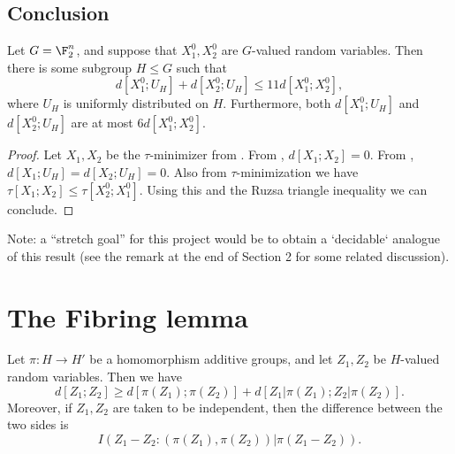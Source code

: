 \section{Conclusion}

\begin{theorem}\label{entropy-pfr}
  \leanok
  Let $G = \F_2^n$, and suppose that $X^0_1, X^0_2$ are $G$-valued random variables.
  Then there is some subgroup $H \leq G$ such that
  \[
    d[X^0_1;U_H] + d[X^0_2;U_H] \le 11 d[X^0_1;X^0_2],
  \]
  where $U_H$ is uniformly distributed on $H$.
  Furthermore, both $d[X^0_1;U_H]$ and $d[X^0_2;U_H]$ are at most $6 d[X^0_1;X^0_2]$.
\end{theorem}

\begin{proof}  \leanok  Let $X_1, X_2$ be the $\tau$-minimizer from .  From , $d[X_1;X_2]=0$.  From , $d[X_1;U_H] = d[X_2; U_H] = 0$.  Also from $\tau$-minimization we have $\tau[X_1;X_2] \leq \tau[X^0_2;X^0_1]$.  Using this and the Ruzsa triangle inequality we can conclude.
\end{proof}

Note: a ``stretch goal'' for this project would be to obtain a `decidable` analogue of this result (see the remark at the end of Section 2 for some related discussion).


\chapter{The Fibring lemma}

\begin{proposition}\label{fibring-ident}
  \leanok
  Let $\pi : H \to H'$ be a homomorphism additive groups, and let $Z_1,Z_2$ be $H$-valued random variables. Then we have
  \[
    d[Z_1; Z_2] \geq d[\pi(Z_1);\pi(Z_2)] + d[Z_1|\pi(Z_1); Z_2 |\pi(Z_2)].
  \]
  Moreover, if $Z_1,Z_2$ are taken to be independent, then the difference between the two sides is
$$I( Z_1 - Z_2 : (\pi(Z_1), \pi(Z_2))  |  \pi(Z_1 - Z_2) ).$$
\end{proposition}


